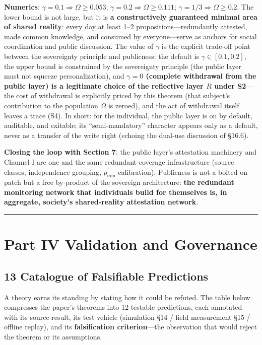 \documentclass[
  11pt]{article}
\begin{document}
\textbf{Numerics}: \(\gamma = 0.1 \Rightarrow \Omega \ge 0.053\);
\(\gamma = 0.2 \Rightarrow \Omega \ge 0.111\);
\(\gamma = 1/3 \Rightarrow \Omega \ge 0.2\). The lower bound is not
large, but it is \textbf{a constructively guaranteed minimal area of
shared reality}: every day at least 1--2 propositions---redundantly
attested, made common knowledge, and consumed by everyone---serve as
anchors for social coordination and public discussion. The value of
\(\gamma\) is the explicit trade-off point between the sovereignty
principle and publicness: the default is \(\gamma \in [0.1, 0.2]\), the
upper bound is constrained by the sovereignty principle (the public
layer must not squeeze personalization), and \textbf{\(\gamma = 0\)
(complete withdrawal from the public layer) is a legitimate choice of
the reflective layer \(R\) under S2}---the cost of withdrawal is
explicitly priced by this theorem (that subject's contribution to the
population \(\Omega\) is zeroed), and the act of withdrawal itself
leaves a trace (S4). In short: for the individual, the public layer is
on by default, auditable, and exitable; its ``semi-mandatory'' character
appears only as a default, never as a transfer of the write right
(echoing the dual-use discussion of §16.6).

\textbf{Closing the loop with Section 7}: the public layer's attestation
machinery and Channel I are one and the same redundant-coverage
infrastructure (source classes, independence grouping, \(p_{\min}\)
calibration). Publicness is not a bolted-on patch but a free by-product
of the sovereign architecture: \textbf{the redundant monitoring network
that individuals build for themselves is, in aggregate, society's
shared-reality attestation network}.

\begin{center}\rule{0.5\linewidth}{0.5pt}\end{center}

\section{Part IV Validation and
Governance}\label{part-iv-validation-and-governance}

\subsection{13 Catalogue of Falsifiable
Predictions}\label{catalogue-of-falsifiable-predictions}

A theory earns its standing by stating how it could be refuted. The
table below compresses the paper's theorems into 12 testable
predictions, each annotated with its source result, its test vehicle
(simulation §14 / field measurement §15 / offline replay), and its
\textbf{falsification criterion}---the observation that would reject the
theorem or its assumptions.
\end{document}
